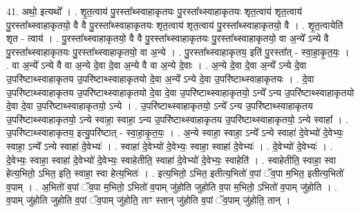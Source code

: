 \documentclass[17pt]{extarticle}
\begin{document}
41. अथो॒ इत्यथो᳚ । . शृ॒त॒त्वाय॑ पु॒रस्ता᳚थ्स्वाहाकृतयः पु॒रस्ता᳚थ्स्वाहाकृतयः शृत॒त्वाय॑ शृत॒त्वाय॑ पु॒रस्ता᳚थ्स्वाहाकृतयो॒ वै वै पु॒रस्ता᳚थ्स्वाहाकृतयः शृत॒त्वाय॑ शृत॒त्वाय॑ पु॒रस्ता᳚थ्स्वाहाकृतयो॒ वै । . शृ॒त॒त्वायेति॑ शृत - त्वाय॑ । . पु॒रस्ता᳚थ्स्वाहाकृतयो॒ वै वै पु॒रस्ता᳚थ्स्वाहाकृतयः पु॒रस्ता᳚थ्स्वाहाकृतयो॒ वा अ॒न्ये᳚ ऽन्ये वै पु॒रस्ता᳚थ्स्वाहाकृतयः पु॒रस्ता᳚थ्स्वाहाकृतयो॒ वा अ॒न्ये । . पु॒रस्ता᳚थ्स्वाहाकृतय॒ इति॑ पु॒रस्ता᳚त् - स्वा॒हा॒कृ॒त॒यः॒ । . वा अ॒न्ये᳚ ऽन्ये वै वा अ॒न्ये दे॒वा दे॒वा अ॒न्ये वै वा अ॒न्ये दे॒वाः । . अ॒न्ये दे॒वा दे॒वा अ॒न्ये᳚ ऽन्ये दे॒वा उ॒परि॑ष्टाथ्स्वाहाकृतय उ॒परि॑ष्टाथ्स्वाहाकृतयो दे॒वा अ॒न्ये᳚ ऽन्ये दे॒वा उ॒परि॑ष्टाथ्स्वाहाकृतयः । . दे॒वा उ॒परि॑ष्टाथ्स्वाहाकृतय उ॒परि॑ष्टाथ्स्वाहाकृतयो दे॒वा दे॒वा उ॒परि॑ष्टाथ्स्वाहाकृतयो॒ ऽन्ये᳚ ऽन्य उ॒परि॑ष्टाथ्स्वाहाकृतयो दे॒वा दे॒वा उ॒परि॑ष्टाथ्स्वाहाकृतयो॒ ऽन्ये । . उ॒परि॑ष्टाथ्स्वाहाकृतयो॒ ऽन्ये᳚ ऽन्य उ॒परि॑ष्टाथ्स्वाहाकृतय उ॒परि॑ष्टाथ्स्वाहाकृतयो॒ ऽन्ये स्वाहा॒ स्वाहा॒ ऽन्य उ॒परि॑ष्टाथ्स्वाहाकृतय उ॒परि॑ष्टाथ्स्वाहाकृतयो॒ ऽन्ये स्वाहा᳚ । . उ॒परि॑ष्टाथ्स्वाहाकृतय॒ इत्यु॒परि॑ष्टात् - स्वा॒हा॒कृ॒त॒यः॒ । . अ॒न्ये स्वाहा॒ स्वाहा॒ ऽन्ये᳚ ऽन्ये स्वाहा॑ दे॒वेभ्यो॑ दे॒वेभ्यः॒ स्वाहा॒ ऽन्ये᳚ ऽन्ये स्वाहा॑ दे॒वेभ्यः॑ । . स्वाहा॑ दे॒वेभ्यो॑ दे॒वेभ्यः॒ स्वाहा॒ स्वाहा॑ दे॒वेभ्यः॑ । . दे॒वेभ्यो॑ दे॒वेभ्यः॑ । . दे॒वेभ्यः॒ स्वाहा॒ स्वाहा॑ दे॒वेभ्यो॑ दे॒वेभ्यः॒ स्वाहेतीति॒ स्वाहा॑ दे॒वेभ्यो॑ दे॒वेभ्यः॒ स्वाहेति॑ । . स्वाहेतीति॒ स्वाहा॒ स्वा हेत्य॒भितो॒ ऽभित॒ इति॒ स्वाहा॒ स्वा हेत्य॒भितः॑ । . इत्य॒भितो॒ ऽभित॒ इतीत्य॒भितो॑ व॒पां ॅव॒पा म॒भित॒ इतीत्य॒भितो॑ व॒पाम् । . अ॒भितो॑ व॒पां ॅव॒पा म॒भितो॒ ऽभितो॑ व॒पाम् जु॑होति जुहोति व॒पा म॒भितो॒ ऽभितो॑ व॒पाम् जु॑होति । . व॒पाम् जु॑होति जुहोति व॒पां ॅव॒पाम् जु॑होति॒ ताꣳ स्तान् जु॑होति व॒पां ॅव॒पाम् जु॑होति॒ तान् । \newline
\end{document}
